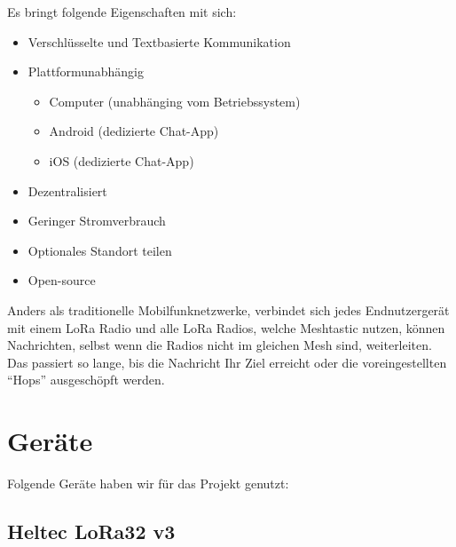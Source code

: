 \documentclass[12pt,a4paper]{article}
\begin{document}
Es bringt folgende Eigenschaften mit sich:
\begin{itemize}
	\item Verschlüsselte und Textbasierte Kommunikation
	\item Plattformunabhängig
	\begin{itemize}
		\item Computer (unabhänging vom Betriebssystem)
		\item Android (dedizierte Chat-App)
		\item iOS (dedizierte Chat-App)
	\end{itemize}
	\item Dezentralisiert
	\item Geringer Stromverbrauch
	\item Optionales Standort teilen
	\item Open-source
\end{itemize}

Anders als traditionelle Mobilfunknetzwerke, verbindet sich jedes Endnutzergerät mit einem LoRa Radio und alle LoRa Radios, welche Meshtastic nutzen, können Nachrichten, selbst wenn die Radios nicht im gleichen Mesh sind, weiterleiten. Das passiert so lange, bis die Nachricht Ihr Ziel erreicht oder die voreingestellten “Hops” ausgeschöpft werden.
\newpage
\section{Geräte}

Folgende Geräte haben wir für das Projekt genutzt:

\subsection{Heltec LoRa32 v3}
\end{document}
